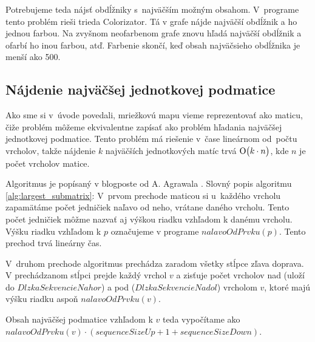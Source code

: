 Potrebujeme teda nájsť obdĺžniky s~najväčším možným obsahom. 
V~programe tento problém rieši trieda Colorizator.
Tá v grafe nájde najväčší obdĺžnik a  ho jednou farbou.
Na zvyšnom neofarbenom grafe znovu hľadá najväčší obdĺžnik a ofarbí ho inou farbou, atď.
Farbenie skončí, keď obsah najväčsieho obdĺžnika je menší ako 500.


\subsection{Nájdenie najväčšej jednotkovej podmatice}
Ako sme si v~úvode povedali, mriežkovú mapu vieme reprezentovať ako maticu, čiže
problém môžeme ekvivalentne zapísať ako problém hľadania najväčšej jednotkovej podmatice.
Tento problém má riešenie v~čase lineárnom od~počtu vrcholov, takže nájdenie $k$ najväčších
jednotkových matíc trvá $\operatorname{O}\bigl(k \cdot n\bigr)$, kde $n$ je počet vrcholov matice.

Algoritmus je popísaný v blogposte od A. Agrawala \cite{agrawal_largest_submatrix}.
Slovný popis algoritmu \ref{alg:largest_submatrix}: 
V~prvom prechode maticou si u~každého vrcholu zapamätáme počet jedničiek naľavo od neho, vrátane daného vrcholu.  
Tento počet jedničiek môžme nazvať aj výškou riadku vzhľadom k danému vrcholu. Výšku riadku vzhľadom k $p$ označujeme v programe $nalavoOdPrvku(p)$.
Tento prechod trvá lineárny čas. 

V~druhom prechode algoritmus prechádza zaradom všetky stĺpce zľava doprava. V prechádzanom stĺpci prejde každý vrchol $v$ a zisťuje počet vrcholov nad (uloží do $DlzkaSekvencieNahor$) a pod ($DlzkaSekvencieNadol$) vrcholom $v$, ktoré majú výšku riadku aspoň $nalavoOdPrvku(v)$. 

Obsah najväčšej podmatice vzhľadom k $v$ teda vypočítame ako\\
$ nalavoOdPrvku(v) \cdot (sequenceSizeUp + 1 + sequenceSizeDown)$.




